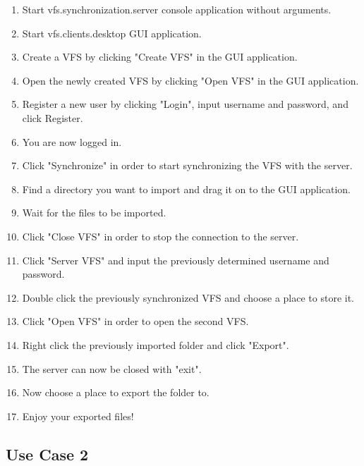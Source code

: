 \documentclass[a4paper,12pt]{article}
\begin{document}
\begin{enumerate}
    \item Start vfs.synchronization.server console application without arguments.
    \item Start vfs.clients.desktop GUI application.
    \item Create a VFS by clicking "Create VFS" in the GUI application.
    \item Open the newly created VFS by clicking "Open VFS" in the GUI application.
    \item Register a new user by clicking "Login", input username and password, and click Register.
    \item You are now logged in.
    \item Click "Synchronize" in order to start synchronizing the VFS with the server.
    \item Find a directory you want to import and drag it on to the GUI application.
    \item Wait for the files to be imported.
    \item Click "Close VFS" in order to stop the connection to the server.
    \item Click "Server VFS" and input the previously determined username and password.
    \item Double click the previously synchronized VFS and choose a place to store it.
    \item Click "Open VFS" in order to open the second VFS.
    \item Right click the previously imported folder and click "Export".
		\item The server can now be closed with "exit".
    \item Now choose a place to export the folder to.
    \item Enjoy your exported files!
\end{enumerate}

\subsection{Use Case 2}
\end{document}
